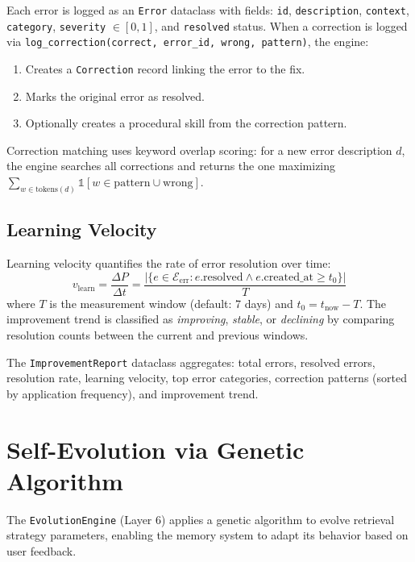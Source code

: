 \documentclass[runningheads]{llncs}
\begin{document}
Each error is logged as an \texttt{Error} dataclass with fields: \texttt{id}, \texttt{description}, \texttt{context}, \texttt{category}, \texttt{severity} $\in [0,1]$, and \texttt{resolved} status. When a correction is logged via \texttt{log\_correction(correct, error\_id, wrong, pattern)}, the engine:
\begin{enumerate}[leftmargin=*]
    \item Creates a \texttt{Correction} record linking the error to the fix.
    \item Marks the original error as resolved.
    \item Optionally creates a procedural skill from the correction pattern.
\end{enumerate}

Correction matching uses keyword overlap scoring: for a new error description $d$, the engine searches all corrections and returns the one maximizing $\sum_{w \in \text{tokens}(d)} \mathbb{1}[w \in \text{pattern} \cup \text{wrong}]$.

\subsection{Learning Velocity}

Learning velocity quantifies the rate of error resolution over time:
\begin{equation}\label{eq:velocity}
    v_{\text{learn}} = \frac{\Delta P}{\Delta t} = \frac{|\{e \in \mathcal{E}_{\text{err}} : e.\text{resolved} \land e.\text{created\_at} \geq t_0\}|}{T}
\end{equation}
where $T$ is the measurement window (default: 7 days) and $t_0 = t_{\text{now}} - T$. The improvement trend is classified as \textit{improving}, \textit{stable}, or \textit{declining} by comparing resolution counts between the current and previous windows.

The \texttt{ImprovementReport} dataclass aggregates: total errors, resolved errors, resolution rate, learning velocity, top error categories, correction patterns (sorted by application frequency), and improvement trend.

\section{Self-Evolution via Genetic Algorithm}\label{sec:evolution}

The \texttt{EvolutionEngine} (Layer 6) applies a genetic algorithm to evolve retrieval strategy parameters, enabling the memory system to adapt its behavior based on user feedback.
\end{document}
